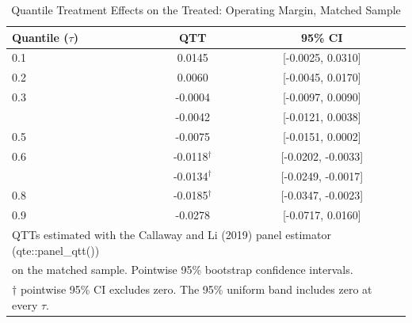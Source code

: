 \begin{table}[!h]
\centering
\caption{Quantile Treatment Effects on the Treated: Operating Margin, Matched Sample}
\centering
\begin{tabular}[t]{lcc}
\toprule
Quantile ($\tau$) & QTT & 95\% CI\\
\midrule
0.1 & 0.0145 & {}[-0.0025, 0.0310]\\
0.2 & 0.0060 & {}[-0.0045, 0.0170]\\
0.3 & -0.0004 & {}[-0.0097, 0.0090]\\
\addlinespace
0.4 & -0.0042 & {}[-0.0121, 0.0038]\\
0.5 & -0.0075 & {}[-0.0151, 0.0002]\\
0.6 & -0.0118$^{\dagger}$ & {}[-0.0202, -0.0033]\\
\addlinespace
0.7 & -0.0134$^{\dagger}$ & {}[-0.0249, -0.0017]\\
0.8 & -0.0185$^{\dagger}$ & {}[-0.0347, -0.0023]\\
0.9 & -0.0278 & {}[-0.0717, 0.0160]\\
\bottomrule

\multicolumn{3}{l}{\footnotesize QTTs estimated with the Callaway and Li (2019) panel estimator (qte::panel\_qtt())}\\
\multicolumn{3}{l}{\footnotesize on the matched sample. Pointwise 95\% bootstrap confidence intervals.}\\
\multicolumn{3}{l}{\footnotesize $\dagger$ pointwise 95\% CI excludes zero. The 95\% uniform band includes zero at every $\tau$.}\\
\end{tabular}
\end{table}
